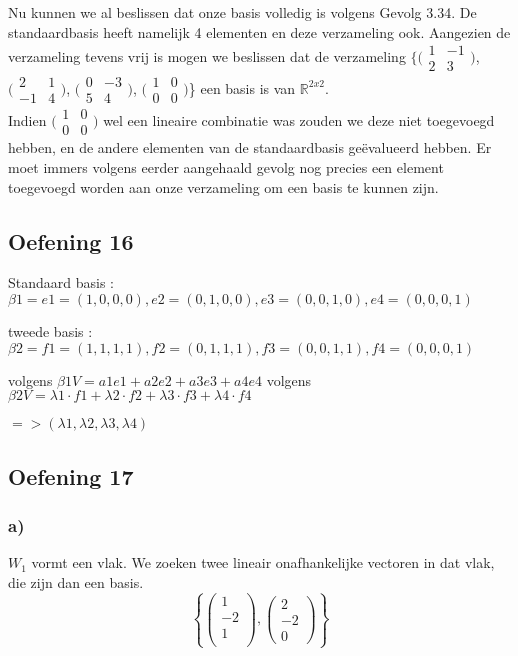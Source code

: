\documentclass[lineaire_algebra_oplossingen.tex]{subfiles}
\begin{document}
Nu kunnen we al beslissen dat onze basis volledig is volgens Gevolg 3.34. De standaardbasis heeft namelijk 4 elementen en deze verzameling ook. Aangezien de verzameling tevens vrij is mogen we beslissen dat de verzameling $\{\bigl(
\begin{smallmatrix}
1&-1\\ 2&3
\end{smallmatrix}
\bigr)$,
$\bigl(
\begin{smallmatrix}
2&1\\ -1&4
\end{smallmatrix}
\bigr)$,
$\bigl(
\begin{smallmatrix}
0&-3\\ 5&4
\end{smallmatrix}
\bigr)$,
$\bigl(
\begin{smallmatrix}
1&0\\ 0&0
\end{smallmatrix}
\bigr)$\} een basis is van $\mathbb{R}^{2x2}$.\\

Indien $\bigl(
\begin{smallmatrix}
1&0\\ 0&0
\end{smallmatrix}
\bigr)$ wel een lineaire combinatie was zouden we deze niet toegevoegd hebben, en de andere elementen van de standaardbasis ge\"evalueerd hebben. Er moet immers volgens eerder aangehaald gevolg nog precies een element toegevoegd worden aan onze verzameling om een basis te kunnen zijn.

\subsection{Oefening 16}

Standaard basis : $\beta1 = {e1 =(1,0,0,0), e2 =(0,1,0,0), e3 = (0,0,1,0), e4 = (0,0,0,1) }$

tweede basis : $\beta2 = {f1 = (1,1,1,1), f2 =(0,1,1,1), f3 = (0,0,1,1), f4= (0,0,0,1) }$

volgens $\beta1  V = a1e1 + a2e2 + a3e3 + a4e4$
volgens $\beta2 V = \lambda1 \cdot f1 + \lambda2 \cdot f2 + \lambda3 \cdot f3 + \lambda4 \cdot f4 $ 

$=> (\lambda1, \lambda2, \lambda3, \lambda4) $

\subsection{Oefening 17}
\subsubsection*{a)}
$W_1$ vormt een vlak. We zoeken twee lineair onafhankelijke vectoren in dat vlak, die zijn dan een basis.
\[
\left\lbrace
\begin{pmatrix}
1\\-2\\1\\
\end{pmatrix}
,
\begin{pmatrix}
2\\-2\\0
\end{pmatrix}
\right\rbrace
\]
\end{document}
